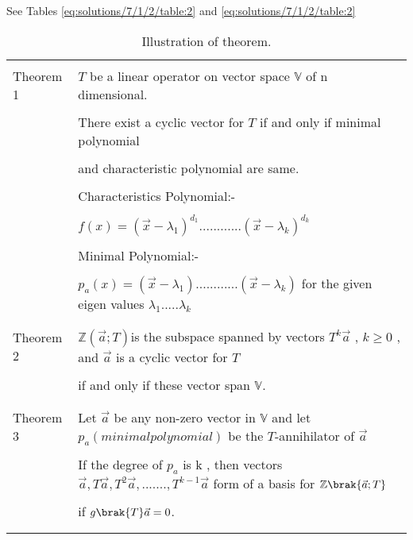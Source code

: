 See Tables \ref{eq:solutions/7/1/2/table:2}
and \ref{eq:solutions/7/1/2/table:2}


\onecolumn
\begin{longtable}{|l|l|}
\hline
\multirow{3}{*}{Theorem 1} & \\
&$T$ be a linear operator on vector space $\mathbb{V}$ of n dimensional.\\
&\\
&There exist a cyclic vector for $T$ if and only if minimal polynomial\\
&\\
&and characteristic polynomial are same.\\
&\\
&Characteristics Polynomial:-\\
&\\
&$f(x)=(\vec{x}-\lambda_1)^{d_1}............(\vec{x}-\lambda_k)^{d_k}$ \\
&\\
&Minimal Polynomial:-\\
&\\
&$p_a(x)=(\vec{x}-\lambda_1)............(\vec{x}-\lambda_k)$ for the given eigen values $\lambda_1.....\lambda_k$\\
&\\
\hline
\multirow{3}{*}{Theorem 2} & \\
&$\mathbb{Z}(\vec{a};T) $is the subspace spanned by vectors $T^k\vec{a}$ , $k\geq 0$ , and $\vec{a}$ is a cyclic vector for $T$\\
&\\
&if and only if these vector span $\mathbb{V}$.\\ 
&\\
\hline
\multirow{3}{*}{Theorem 3} & \\
&Let $\vec{a}$ be any non-zero vector in $\mathbb{V}$ and let $p_a(minimal polynomial)$ be the $T$-annihilator of $\vec{a}$\\
Cyclic Base
&\\
&If the degree of $p_a$ is k , then vectors $\vec{a},T\vec{a},T^2\vec{a},.......,T^{k-1}\vec{a}$ form of a basis  for $\mathbb{Z}\brak{\vec{a};T}$ \\
&\\
&if $g\brak{T}\vec{a}=0$.\\
&\\
\hline
\caption{Illustration of theorem.}
\label{eq:solutions/7/1/2/table:1}
\end{longtable}
